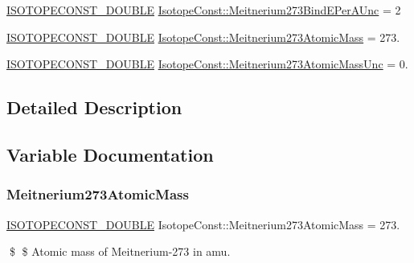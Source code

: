 \begin{DoxyCompactItemize}
\mbox{\hyperlink{group___isotope_const-_macros_ga8f45a7272ce02c0b4c65c44636ed719a}{I\+S\+O\+T\+O\+P\+E\+C\+O\+N\+S\+T\+\_\+\+D\+O\+U\+B\+LE}} \mbox{\hyperlink{group___isotope_const-_meitnerium-_mt273_ga0f9286bc86d226c01c45ec8ec3e82a88}{Isotope\+Const\+::\+Meitnerium273\+Bind\+E\+Per\+A\+Unc}} = 2
\item 
\mbox{\hyperlink{group___isotope_const-_macros_ga8f45a7272ce02c0b4c65c44636ed719a}{I\+S\+O\+T\+O\+P\+E\+C\+O\+N\+S\+T\+\_\+\+D\+O\+U\+B\+LE}} \mbox{\hyperlink{group___isotope_const-_meitnerium-_mt273_ga08bed1045e39506fceee91b9dbe50e57}{Isotope\+Const\+::\+Meitnerium273\+Atomic\+Mass}} = 273.
\item 
\mbox{\hyperlink{group___isotope_const-_macros_ga8f45a7272ce02c0b4c65c44636ed719a}{I\+S\+O\+T\+O\+P\+E\+C\+O\+N\+S\+T\+\_\+\+D\+O\+U\+B\+LE}} \mbox{\hyperlink{group___isotope_const-_meitnerium-_mt273_ga8e5256aa7920eb031de0e9edbeafa6a5}{Isotope\+Const\+::\+Meitnerium273\+Atomic\+Mass\+Unc}} = 0.
\end{DoxyCompactItemize}


\subsection{Detailed Description}


\subsection{Variable Documentation}
\mbox{\label{group___isotope_const-_meitnerium-_mt273_ga08bed1045e39506fceee91b9dbe50e57}} 
\subsubsection{\texorpdfstring{Meitnerium273\+Atomic\+Mass}{Meitnerium273AtomicMass}}
{\footnotesize\ttfamily \mbox{\hyperlink{group___isotope_const-_macros_ga8f45a7272ce02c0b4c65c44636ed719a}{I\+S\+O\+T\+O\+P\+E\+C\+O\+N\+S\+T\+\_\+\+D\+O\+U\+B\+LE}} Isotope\+Const\+::\+Meitnerium273\+Atomic\+Mass = 273.}

\$ \$ Atomic mass of Meitnerium-\/273 in amu. \mbox{\label{group___isotope_const-_meitnerium-_mt273_ga8e5256aa7920eb031de0e9edbeafa6a5}} 
